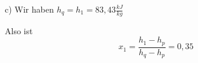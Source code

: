 c) Wir haben $h_q = h_1 = 83,43 \frac{kJ}{kg}$

Also ist
\[
x_1 = \frac{h_1 - h_p}{h_q - h_p} = 0,35
\]